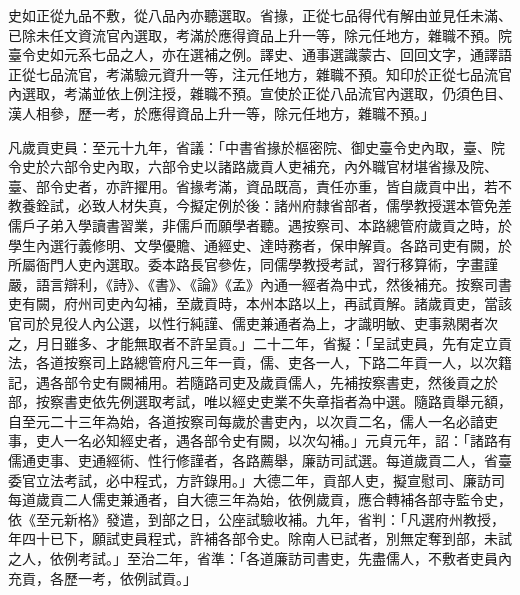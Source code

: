 \begin{pinyinscope}
史如正從九品不敷，從八品內亦聽選取。省掾，正從七品得代有解由並見任未滿、已除未任文資流官內選取，考滿於應得資品上升一等，除元任地方，雜職不預。院臺令史如元系七品之人，亦在選補之例。譯史、通事選識蒙古、回回文字，通譯語正從七品流官，考滿驗元資升一等，注元任地方，雜職不預。知印於正從七品流官內選取，考滿並依上例注授，雜職不預。宣使於正從八品流官內選取，仍須色目、漢人相參，歷一考，於應得資品上升一等，除元任地方，雜職不預。」



 凡歲貢吏員：至元十九年，省議：「中書省掾於樞密院、御史臺令史內取，臺、院令史於六部令史內取，六部令史以諸路歲貢人吏補充，內外職官材堪省掾及院、臺、部令史者，亦許擢用。省掾考滿，資品既高，責任亦重，皆自歲貢中出，若不教養銓試，必致人材失真，今擬定例於後：諸州府隸省部者，儒學教授選本管免差儒戶子弟入學讀書習業，非儒戶而願學者聽。遇按察司、本路總管府歲貢之時，於學生內選行義修明、文學優贍、通經史、達時務者，保申解貢。各路司吏有闕，於所屬衙門人吏內選取。委本路長官參佐，同儒學教授考試，習行移算術，字畫謹嚴，語言辯利，《詩》、《書》、《論》《孟》內通一經者為中式，然後補充。按察司書吏有闕，府州司吏內勾補，至歲貢時，本州本路以上，再試貢解。諸歲貢吏，當該官司於見役人內公選，以性行純謹、儒吏兼通者為上，才識明敏、吏事熟閑者次之，月日雖多、才能無取者不許呈貢。」二十二年，省擬：「呈試吏員，先有定立貢法，各道按察司上路總管府凡三年一貢，儒、吏各一人，下路二年貢一人，以次籍記，遇各部令史有闕補用。若隨路司吏及歲貢儒人，先補按察書吏，然後貢之於部，按察書吏依先例選取考試，唯以經史吏業不失章指者為中選。隨路貢舉元額，自至元二十三年為始，各道按察司每歲於書吏內，以次貢二名，儒人一名必諳吏事，吏人一名必知經史者，遇各部令史有闕，以次勾補。」元貞元年，詔：「諸路有儒通吏事、吏通經術、性行修謹者，各路薦舉，廉訪司試選。每道歲貢二人，省臺委官立法考試，必中程式，方許錄用。」大德二年，貢部人吏，擬宣慰司、廉訪司每道歲貢二人儒吏兼通者，自大德三年為始，依例歲貢，應合轉補各部寺監令史，依《至元新格》發遣，到部之日，公座試驗收補。九年，省判：「凡選府州教授，年四十已下，願試吏員程式，許補各部令史。除南人已試者，別無定奪到部，未試之人，依例考試。」至治二年，省準：「各道廉訪司書吏，先盡儒人，不敷者吏員內充貢，各歷一考，依例試貢。」




\end{pinyinscope}
